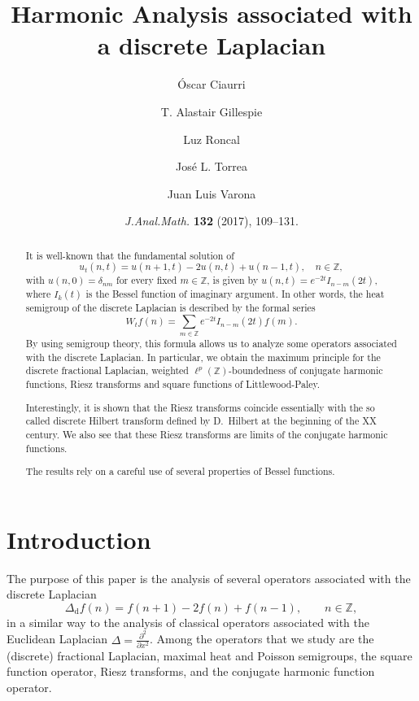 \documentclass[11pt]{amsart}
\title[Harmonic Analysis associated with a discrete Laplacian]{Harmonic Analysis associated with a discrete Laplacian}
\author[\'O. Ciaurri, T. A. Gillespie, L. Roncal, J. L. Torrea, and J. L. Varona]{\'Oscar Ciaurri \and T. Alastair Gillespie \and Luz Roncal \and Jos\'e L. Torrea \and Juan Luis Varona}
\date{\textit{J.\@ Anal.\@ Math.\@} \textbf{132} (2017), 109--131.}
\numberwithin{equation}{section}
\newcommand{\Z}{\mathbb{Z}}
\newcommand{\dis}{\mathrm{d}}
\theoremstyle{plain}
\theoremstyle{remark}
\begin{document}
\begin{abstract}
It is well-known that the fundamental solution of
$$
u_t(n,t)= u(n+1,t)-2u(n,t)+u(n-1,t), \quad n\in\mathbb{Z},
$$
with  $u(n,0) =\delta_{nm}$ for every fixed $m \in\mathbb{Z}$,
is given by $u(n,t) = e^{-2t}I_{n-m}(2t)$, where $I_k(t)$ is the Bessel function of imaginary argument.
In other words, the heat semigroup of the discrete Laplacian is described  by the formal series
$$
W_tf(n) = \sum_{m\in\mathbb{Z}} e^{-2t} I_{n-m}(2t) f(m).
$$
By using  semigroup theory, this formula allows us to analyze some operators associated with the discrete  Laplacian. In particular, we obtain the maximum principle for the discrete fractional Laplacian, weighted $\ell^p(\mathbb{Z})$-boundedness  of conjugate harmonic functions, Riesz transforms and square functions of Littlewood-Paley.

Interestingly,  it is shown that the Riesz transforms coincide essentially with the so called discrete Hilbert transform defined by D.~Hilbert at the beginning of the XX century. We also see that these Riesz transforms are limits of the conjugate harmonic functions.

The results rely on a careful use of several properties of Bessel functions.
\end{abstract}

\maketitle

\section{Introduction}

The purpose of this paper is the analysis of several operators associated with the discrete Laplacian
\[
\Delta_{\dis} f(n) = f(n+1)-2f(n)+f(n-1),\qquad n \in \Z,
\]
in a similar way to the analysis of classical operators associated with the Euclidean Laplacian $\Delta = \frac{\partial^2}{\partial x^2}$. Among the operators that we study are the (discrete) fractional Laplacian, maximal heat and Poisson semigroups, the square function operator, Riesz transforms, and the conjugate harmonic function operator.
\end{document}
